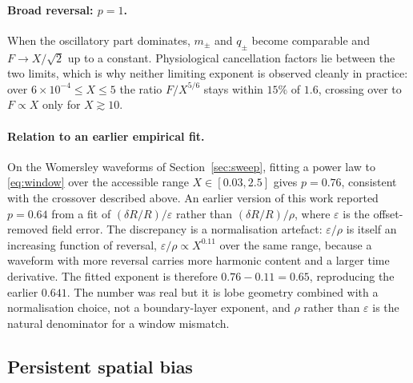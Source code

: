 \documentclass[11pt,a4paper]{article}
\newcommand{\eps}{\varepsilon}
\begin{document}
\paragraph{Broad reversal: $p=1$.}
When the oscillatory part dominates, $m_\pm$ and $q_\pm$ become comparable
and $F\to X/\sqrt2$ up to a constant. Physiological cancellation factors lie
between the two limits, which is why neither limiting exponent is observed
cleanly in practice: over $6\times10^{-4}\le X\le5$ the ratio $F/X^{5/6}$
stays within $15\%$ of $1.6$, crossing over to $F\propto X$ only for
$X\gtrsim10$.

\paragraph{Relation to an earlier empirical fit.}
On the Womersley waveforms of Section~\ref{sec:sweep}, fitting a power law to
\eqref{eq:window} over the accessible range $X\in[0.03,2.5]$ gives $p=0.76$,
consistent with the crossover described above. An earlier version of this
work reported $p=0.64$ from a fit of $(\delta R/R)/\eps$ rather than
$(\delta R/R)/\rho$, where $\eps$ is the offset-removed field error. The
discrepancy is a normalisation artefact: $\eps/\rho$ is itself an increasing
function of reversal, $\eps/\rho\propto X^{0.11}$ over the same range,
because a waveform with more reversal carries more harmonic content and a
larger time derivative. The fitted exponent is therefore $0.76-0.11=0.65$,
reproducing the earlier $0.641$. The number was real but it is lobe geometry
combined with a normalisation choice, not a boundary-layer exponent, and
$\rho$ rather than $\eps$ is the natural denominator for a window mismatch.

\subsection{Persistent spatial bias}
\label{sec:bias}
\end{document}
